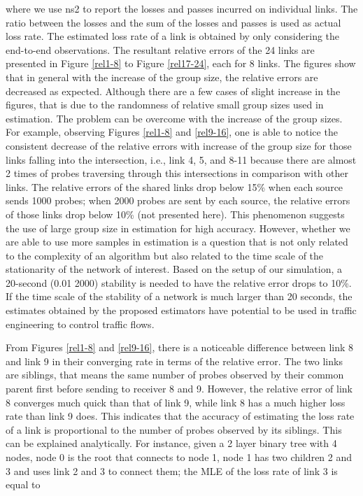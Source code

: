 \documentclass[10pt,twocolumn]{IEEEtran}
\begin{document}
\noindent where we use ns2 to report the losses and passes incurred on
individual links. The ratio between the losses and the sum of the
losses and passes is used as actual loss rate. The estimated loss rate
of a link is obtained by  only considering the end-to-end
observations. The resultant relative errors of the 24 links are
presented in Figure \ref{rel1-8} to Figure \ref{rel17-24}, each for 8
links. The figures show that in general with the increase of the group
size, the relative errors are decreased as expected. Although there
are a few cases of slight increase in the figures, that is due to the
randomness of relative small group sizes used in estimation. The
problem can be overcome with the increase of the group sizes. For
example, observing Figures \ref{rel1-8} and \ref{rel9-16}, one is able
to notice the consistent decrease of the relative errors with increase
of the group size for those links falling into the intersection, i.e.,
link 4, 5, and 8-11 because there are almost 2 times of probes
traversing through this intersections in comparison with other links.
The relative errors of the shared links drop below 15\% when each
source sends 1000 probes; when 2000 probes are sent by each source,
the relative errors of those links drop below 10\% (not presented
here). This phenomenon suggests the use of large group size in
estimation for high accuracy. However, whether we are able to use more
samples in estimation is a question that is not only related to the
complexity of an algorithm but also related to the time scale of the
stationarity of the network of interest. Based on the setup of our
simulation, a 20-second (0.01  2000) stability is needed to
have the relative error drops to 10\%. If the time scale of the
stability of a network is much larger than 20 seconds, the estimates
obtained by the proposed estimators have potential to be used in
traffic engineering to control traffic flows.

From Figures \ref{rel1-8} and \ref{rel9-16},  there is a noticeable
difference between link 8 and link 9 in their converging rate in terms
of the relative error. The two links are siblings, that means the same
number of probes observed by their common parent first before sending
to receiver 8 and 9. However, the relative error of link 8 converges
much quick than that of link 9, while link 8 has a much higher loss
rate than link 9 does. This indicates that the accuracy of estimating
the loss rate of a link is proportional to the number of probes
observed by its siblings. This can be explained analytically. For
instance, given a 2 layer binary tree with 4 nodes, node 0 is the root
that connects to node 1, node 1 has two children 2 and 3 and uses link
2 and 3 to connect them; the MLE of the loss rate of link 3 is equal
to
\end{document}

